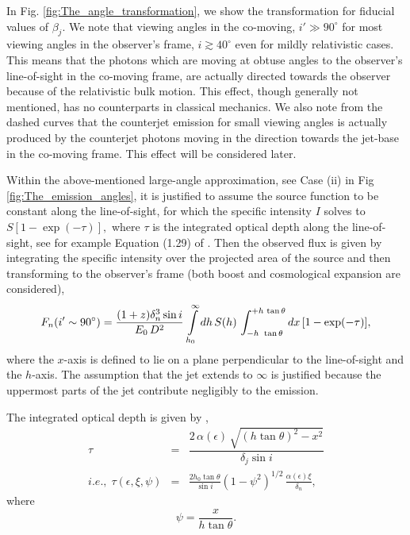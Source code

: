 In Fig. \ref{fig:The_angle_transformation}, we show the transformation for fiducial values of $ \beta_j . $ We note that viewing angles in the co-moving, $ i' \gg 90 ^{\circ} $ for most viewing angles in the observer's frame, $ i \gtrsim 40^{\circ} $ even for mildly relativistic cases. This means that the photons which are moving at obtuse angles to the observer's line-of-sight in the co-moving frame, are actually directed towards the observer because of the relativistic bulk motion. This effect, though generally not mentioned, has no counterparts in classical mechanics. We also note from the dashed curves that the counterjet emission for small viewing angles is actually produced by the counterjet photons moving in the direction towards the jet-base in the co-moving frame. This effect will be considered later.

Within the above-mentioned large-angle approximation, see Case (ii) in Fig \ref{fig:The_emission_angles}, it is justified to assume the source function to be constant along the line-of-sight, for which the specific intensity $ I $ solves to $ S [ 1 - \exp(-\tau) ],  $ where $ \tau $ is the integrated optical depth along the line-of-sight, see for example Equation (1.29) of \citealt{Rybicki_&_Lightman}. Then the observed flux is given by integrating the specific intensity over the projected area of the source and then transforming to the observer's frame (both boost and cosmological expansion are considered),
\begin{equation}
F_{n} (i' \sim 90^{\circ}) = \frac{ (1+z)\delta_n^{3} \sin i }{ \ee\, D^2 } \, \intop_{h_0}^{\infty} dh \, S(h) \, \int_{-h \ \tan \theta}^{+h \, \tan \theta} dx \, [1 - \exp(-\tau)],
\label{eq:Flux-n_beginning}
\end{equation} where the $ x $-axis is defined to lie on a plane perpendicular to the line-of-sight and the $ h $-axis. The assumption that the jet extends to $ \infty $ is justified because the uppermost parts of the jet contribute negligibly to the emission.

The integrated optical depth is given by \citep{Heinz-2006-ApJ,Zdziarski_et_al.-2012-MNRAS-MeV_tail_CX1},
\begin{eqnarray}
\tau & = & \dfrac{2 \, \alpha(\epsilon) \, \sqrt{ (h \tan \theta)^{2} - x^2 }  }{ \delta_j \sin i } \label{eq:optical_depth_side_view_1} \\
i.e., \; \tau( \epsilon, \xi, \psi ) & = & \frac{2 h_0 \tan \theta}{\sin i}(1-\psi^{2})^{1/2} \,\frac{\alpha(\epsilon) \xi}{\delta_{n}} , \label{eq:optical_depth_side_view_2}
\end{eqnarray} where
\begin{equation}
\psi = \frac{x}{h \tan \theta}. \label{eq:psi}
\end{equation}

